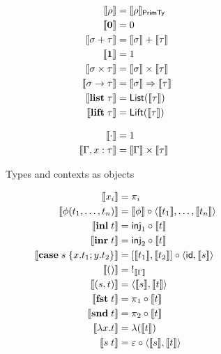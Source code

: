 \begin{figure}
\begin{subfigure}[t]{0.47\linewidth}
    \small
    \begin{align*}
    \llbracket \rho \rrbracket &= \llbracket \rho \rrbracket_{\mathsf{PrimTy}}
    \\
    \llbracket \mathbf{0} \rrbracket &= 0
    \\
    \llbracket \sigma + \tau \rrbracket &= \textstyle {\llbracket \sigma \rrbracket} + {\llbracket \tau \rrbracket}
    \\
    \llbracket \mathbf{1} \rrbracket &= 1
    \\
    \llbracket \sigma \times \tau \rrbracket &= \llbracket \sigma \rrbracket \times \llbracket \tau \rrbracket
    \\
    \llbracket \sigma \to \tau \rrbracket &= \llbracket \sigma \rrbracket \Rightarrow \llbracket \tau \rrbracket
    \\
    \llbracket \mathbf{list}\;\tau \rrbracket &= \mathsf{List}(\llbracket \tau \rrbracket)
    \\
    \llbracket \mathbf{lift}\;\tau \rrbracket &= \mathsf{Lift}(\llbracket \tau \rrbracket)
    \\[3mm]
    \llbracket \cdot \rrbracket &= 1
    \\
    \llbracket \Gamma, x: \tau \rrbracket &= \llbracket \Gamma \rrbracket \times \llbracket \tau \rrbracket
    \end{align*}
  \caption{Types and contexts as objects}
  \label{fig:semantics:types}
\end{subfigure}
\begin{subfigure}{0.8\linewidth}
  \small
  \begin{align*}
  \sem{x_i} &= \pi_i
  \\
  \sem{\phi(t_1, \ldots, t_n)}
  &=
  \sem{\phi} \comp \prodM{\sem{t_1}}{\ldots, \sem{t_n}}
  \\
  \sem{\tmInl{t}} &= \mathsf{inj}_1 \comp \sem{t}
  \\
  \sem{\tmInr{t}} &= \mathsf{inj}_2 \comp \sem{t}
  \\
  \sem{\tmCase{s}{x}{t_1}{y}{t_2}} &= \coprodM{\sem{t_1}}{\sem{t_2}} \comp \prodM{\id}{\sem{s}}
  \\
  \sem{\tmUnit} &=\;!_{\sem{\Gamma}}
  \\
  \sem{\tmPair{s}{t}} &= \prodM{\sem{s}}{\sem{t}}
  \\
  \sem{\tmFst{t}} &= \pi_1 \comp \sem{t}
  \\
  \sem{\tmSnd{t}} &= \pi_2 \comp \sem{t}
  \\
  \sem{\tmFun{x}{t}} &= \lambda(\sem{t})
  \\
  \sem{\tmApp{s}{t}} &= \eval \comp \prodM{\sem{s}}{\sem{t}}

\end{align*}
\end{subfigure}
\end{figure}
